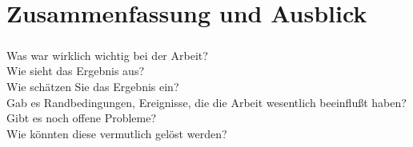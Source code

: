 \chapter{Zusammenfassung und Ausblick}\label{chp:zusammenfassung}


\paragraph{}
Was war wirklich wichtig bei der Arbeit? \\
Wie sieht das Ergebnis aus?\\
Wie schätzen Sie das Ergebnis ein?\\
Gab es Randbedingungen, Ereignisse, die die Arbeit wesentlich beeinflußt haben?\\
Gibt es noch offene Probleme?\\
Wie könnten diese vermutlich gelöst werden?\\